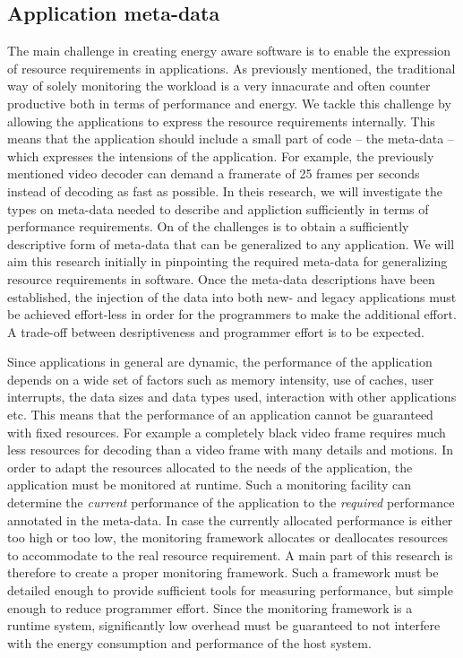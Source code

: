 \documentclass{article}
\begin{document}
\subsection{Application meta-data}
The main challenge in creating energy aware software is to enable the expression of resource requirements in applications.
As previously mentioned, the traditional way of solely monitoring the workload is a very innacurate and often counter productive both in terms of performance and energy.
We tackle this challenge by allowing the applications to express the resource requirements internally.
This means that the application should include a small part of code -- the meta-data -- which expresses the intensions of the application.
For example, the previously mentioned video decoder can demand a framerate of 25 frames per seconds instead of decoding as fast as possible.
In theis research, we will investigate the types on meta-data needed to describe and appliction sufficiently in terms of performance requirements.
On of the challenges is to obtain a sufficiently descriptive form of meta-data that can be generalized to any application.
We will aim this research initially in pinpointing the required meta-data for generalizing resource requirements in software.
Once the meta-data descriptions have been established, the injection of the data into both new- and legacy applications must be achieved effort-less in order for the programmers to make the additional effort.
A trade-off between desriptiveness and programmer effort is to be expected.

Since applications in general are dynamic, the performance of the application depends on a wide set of factors such as memory intensity, use of caches, user interrupts, the data sizes and data types used, interaction with other applications etc. 
This means that the performance of an application cannot be guaranteed with fixed resources.
For example a completely black video frame requires much less resources for decoding than a video frame with many details and motions.
In order to adapt the resources allocated to the needs of the application, the application must be monitored at runtime.
Such a monitoring facility can determine the \textit{current} performance of the application to the \textit{required} performance annotated in the meta-data.
In case the currently allocated performance is either too high or too low, the monitoring framework allocates or deallocates resources to accommodate to the real resource requirement.
A main part of this research is therefore to create a proper monitoring framework.
Such a framework must be detailed enough to provide sufficient tools for measuring performance, but simple enough to reduce programmer effort.
Since the monitoring framework is a runtime system, significantly low overhead must be guaranteed to not interfere with the energy consumption and performance of the host system.
\end{document}

